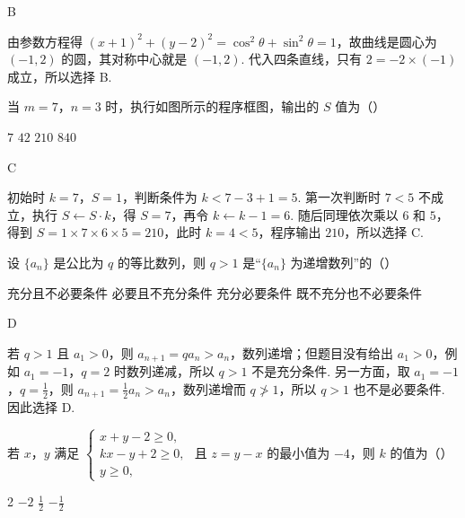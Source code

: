 \begin{answer}
B
\end{answer}

\begin{solution}
由参数方程得
\((x+1)^{2}+(y-2)^{2}=\cos^{2}\theta+\sin^{2}\theta=1\)，故曲线是圆心为 \((-1,2)\) 的圆，其对称中心就是 \((-1,2)\). 代入四条直线，只有 \(2=-2\times(-1)\) 成立，所以选择 B.
\end{solution}

\begin{problem}
当 \(m = 7\)，\(n = 3\) 时，执行如图所示的程序框图，输出的 \(S\) 值为（\quad）


\choices
    {\(7\)}
    {\(42\)}
    {\(210\)}
    {\(840\)}
\end{problem}

\begin{answer}
C
\end{answer}

\begin{solution}
初始时 \(k=7\)，\(S=1\)，判断条件为 \(k<7-3+1=5\). 第一次判断时 \(7<5\) 不成立，执行 \(S\leftarrow S\cdot k\)，得 \(S=7\)，再令 \(k\leftarrow k-1=6\). 随后同理依次乘以 \(6\) 和 \(5\)，得到 \(S=1\times7\times6\times5=210\)，此时 \(k=4<5\)，程序输出 \(210\)，所以选择 C.
\end{solution}

\begin{problem}
设 \(\{a_{n}\}\) 是公比为 \(q\) 的等比数列，则 \(q > 1\) 是“\(\{a_{n}\}\) 为递增数列”的（\quad）

\choices
    {充分且不必要条件}
    {必要且不充分条件}
    {充分必要条件}
    {既不充分也不必要条件}
\end{problem}

\begin{answer}
D
\end{answer}

\begin{solution}
若 \(q>1\) 且 \(a_{1}>0\)，则 \(a_{n+1}=qa_n>a_n\)，数列递增；但题目没有给出 \(a_{1}>0\)，例如 \(a_{1}=-1\)，\(q=2\) 时数列递减，所以 \(q>1\) 不是充分条件.
另一方面，取 \(a_{1}=-1\)，\(q=\frac12\)，则 \(a_{n+1}=\frac12a_n>a_n\)，数列递增而 \(q\not>1\)，所以 \(q>1\) 也不是必要条件. 因此选择 D.
\end{solution}

\begin{problem}
若 \(x\)，\(y\) 满足 \(\begin{cases}
x + y - 2 \geqslant 0,\\
kx - y + 2 \geqslant 0,\\
y \geqslant 0,
\end{cases}\) 且 \(z = y - x\) 的最小值为 \(-4\)，则 \(k\) 的值为（\quad）

\choices
    {2}
    {\(-2\)}
    {\( \frac{1}{2} \)}
    {\(-\frac{1}{2}\)}
\end{problem}


